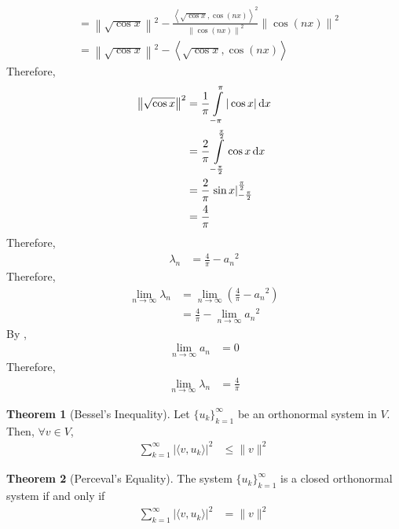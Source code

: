 \documentclass[fleqn, 8pt]{amsart}
\theoremstyle{definition}
\theoremstyle{theorem}
\newtheorem{theorem}{Theorem}
\begin{document}
\begin{multicols}{2}
\begin{spacing}{0.7}
\begin{solution}
\begin{align*}
                          & = \left\| \sqrt{\cos x} \right\|^2 - \frac{\left\langle \sqrt{\cos x},\cos(n x) \right\rangle^2}{\left\| \cos(n x) \right\|^2} \left\| \cos(n x) \right\|^2 \\
                          & = \left\| \sqrt{\cos x} \right\|^2 - \left\langle \sqrt{\cos x},\cos(n x) \right\rangle
	\end{align*}
	Therefore,
	\begin{align*}
		\left\| \sqrt{\cos x} \right\|^2 & = \frac{1}{\pi} \int\limits_{-\pi}^{\pi} |\cos x| \dif x                   \\
                                                 & = \frac{2}{\pi} \int\limits_{-\frac{\pi}{2}}^{\frac{\pi}{2}} \cos x \dif x \\
                                                 & = \frac{2}{\pi} \left. \sin x \right|_{-\frac{\pi}{2}}^{\frac{\pi}{2}}     \\
                                                 & = \frac{4}{\pi}
	\end{align*}
	Therefore,
	\begin{align*}
		\lambda_n & = \frac{4}{\pi} - {a_n}^2
	\end{align*}
	Therefore,
	\begin{align*}
		\lim\limits_{n \to \infty} \lambda_n & = \lim\limits_{n \to \infty} \left( \frac{4}{\pi} - {a_n}^2 \right) \\
                                                     & = \frac{4}{\pi} - \lim\limits_{n \to \infty} {a_n}^2
	\end{align*}
	By ,
	\begin{align*}
		\lim\limits_{n \to \infty} a_n & = 0
	\end{align*}
	Therefore,
	\begin{align*}
		\lim\limits_{n \to \infty} \lambda_n & = \frac{4}{\pi}
	\end{align*}
\end{solution}

\begin{theorem}[Bessel's Inequality]
	Let $\{u_k\}_{k = 1}^{\infty}$ be an orthonormal system in $V$.
	Then, $\forall v \in V$,
	\begin{align*}
		\sum\limits_{k = 1}^{\infty} \left| \langle v,u_k \rangle \right|^2 &\le \|v\|^2
	\end{align*}
	\label{thm:Bessel's_Inequality}
\end{theorem}

\begin{theorem}[Perceval's Equality]
	The system $\{u_k\}_{k = 1}^{\infty}$ is a closed orthonormal system if and only if
	\begin{align*}
		\sum\limits_{k = 1}^{\infty} \left| \langle v,u_k \rangle \right|^2 &= \|v\|^2
	\end{align*}
	\label{thm:Perceval's_Equality}
\end{theorem}


\end{spacing}
\end{multicols}
\end{document}
